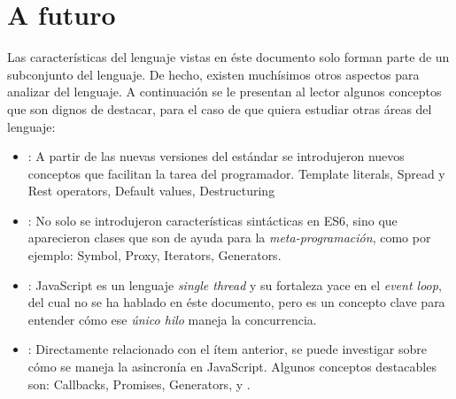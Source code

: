 \section{A futuro}

Las características del lenguaje vistas en éste documento solo forman parte de un subconjunto del lenguaje. De hecho, existen muchísimos otros aspectos para analizar del lenguaje. A continuación se le presentan al lector algunos conceptos que son dignos de destacar, para el caso de que quiera estudiar otras áreas del lenguaje:

\begin{itemize}
\item {}: A partir de las nuevas versiones del estándar se introdujeron nuevos conceptos que facilitan la tarea del programador. Template literals, Spread y Rest operators, Default values, Destructuring
\item {}: No solo se introdujeron características sintácticas en ES6, sino que aparecieron clases que son de ayuda para la \textit{meta-programación}, como por ejemplo: Symbol, Proxy, Iterators, Generators.
\item {}: JavaScript es un lenguaje \textit{single thread} y su fortaleza yace en el \textit{event loop}, del cual no se ha hablado en éste documento, pero es un concepto clave para entender cómo ese \textit{único hilo} maneja la concurrencia.
\item {}: Directamente relacionado con el ítem anterior, se puede investigar sobre cómo se maneja la asincronía en JavaScript. Algunos conceptos destacables son: Callbacks, Promises, Generators,  y .
\end{itemize}
